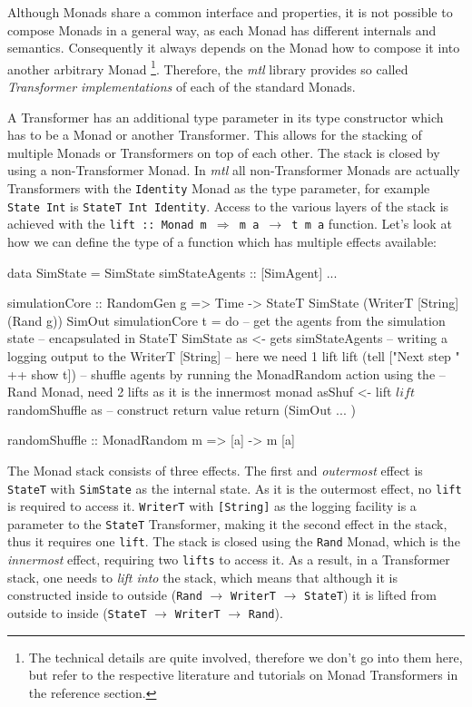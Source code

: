 Although Monads share a common interface and properties, it is not possible to compose Monads in a general way, as each Monad has different internals and semantics. Consequently it always depends on the Monad how to compose it into another arbitrary Monad \footnote{The technical details are quite involved, therefore we don't go into them here, but refer to the respective literature and tutorials on Monad Transformers \cite{allen_haskell_2016, jones_functional_1995, jones_tackling_2002} in the reference section.}. Therefore, the \textit{mtl} library provides so called \textit{Transformer implementations} of each of the standard Monads.

A Transformer has an additional type parameter in its type constructor which has to be a Monad or another Transformer. This allows for the stacking of multiple Monads or Transformers on top of each other. The stack is closed by using a non-Transformer Monad. In \textit{mtl} all non-Transformer Monads are actually Transformers with the \texttt{Identity} Monad as the type parameter, for example \texttt{State Int} is \texttt{StateT Int Identity}. Access to the various layers of the stack is achieved with the \texttt{lift :: Monad m $\Rightarrow$ m a $\rightarrow$ t m a} function. Let's look at how we can define the type of a function which has multiple effects available:

\begin{HaskellCode}
data SimState = SimState { simStateAgents :: [SimAgent] ... }

simulationCore :: RandomGen g 
               => Time
               -> StateT SimState (WriterT [String] (Rand g)) SimOut
simulationCore t = do
  -- get the agents from the simulation state 
  -- encapsulated in StateT SimState
  as <- gets simStateAgents
  -- writing a logging output to the WriterT [String]
  -- here we need 1 lift 
  lift (tell ["Next step " ++ show t])
  -- shuffle agents by running the MonadRandom action using the
  -- Rand Monad, need 2 lifts as it is the innermost monad
  asShuf <- lift $ lift $ randomShuffle as
  -- construct return value
  return (SimOut { ... })
  
randomShuffle :: MonadRandom m => [a] -> m [a]
\end{HaskellCode}

The Monad stack consists of three effects. The first and \textit{outermost} effect is \texttt{StateT} with \texttt{SimState} as the internal state. As it is the outermost effect, no \texttt{lift} is required to access it. \texttt{WriterT} with \texttt{[String]} as the logging facility is a parameter to the \texttt{StateT} Transformer, making it the second effect in the stack, thus it requires one \texttt{lift}. The stack is closed using the \texttt{Rand} Monad, which is the \textit{innermost} effect, requiring two \texttt{lifts} to access it. As a result, in a Transformer stack, one needs to \textit{lift into} the stack, which means that although it is constructed inside to outside (\texttt{Rand} $\rightarrow$ \texttt{WriterT} $\rightarrow$ \texttt{StateT}) it is lifted from outside to inside (\texttt{StateT} $\rightarrow$ \texttt{WriterT} $\rightarrow$ \texttt{Rand}).

